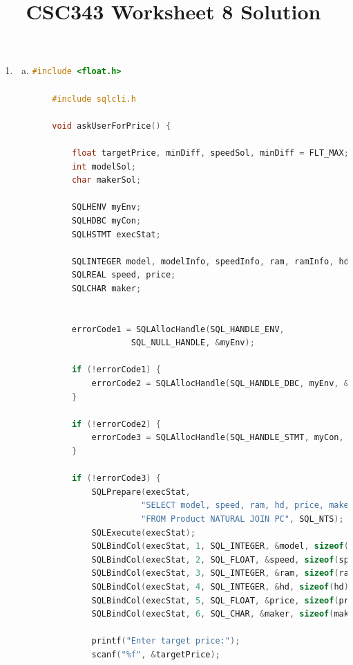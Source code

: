 \documentclass[12pt]{article}
\begin{document}
\title{CSC343 Worksheet 8 Solution}
\maketitle

\bigskip

\begin{enumerate}[1.]
    \item

    \bigskip

    \begin{enumerate}[a)]
        \item

    \begin{lstlisting}[language=c]
    #include <float.h>

    #include sqlcli.h

    void askUserForPrice() {

        float targetPrice, minDiff, speedSol, minDiff = FLT_MAX;
        int modelSol;
        char makerSol;

        SQLHENV myEnv;
        SQLHDBC myCon;
        SQLHSTMT execStat;

        SQLINTEGER model, modelInfo, speedInfo, ram, ramInfo, hd, hdInfo, priceInfo, makerInfo;
        SQLREAL speed, price;
        SQLCHAR maker;


        errorCode1 = SQLAllocHandle(SQL_HANDLE_ENV,
                    SQL_NULL_HANDLE, &myEnv);

        if (!errorCode1) {
            errorCode2 = SQLAllocHandle(SQL_HANDLE_DBC, myEnv, &myCon);
        }

        if (!errorCode2) {
            errorCode3 = SQLAllocHandle(SQL_HANDLE_STMT, myCon, &execStat)
        }

        if (!errorCode3) {
            SQLPrepare(execStat,
                      "SELECT model, speed, ram, hd, price, maker "
                      "FROM Product NATURAL JOIN PC", SQL_NTS);
            SQLExecute(execStat);
            SQLBindCol(execStat, 1, SQL_INTEGER, &model, sizeof(model), &modelInfo);
            SQLBindCol(execStat, 2, SQL_FLOAT, &speed, sizeof(speed), &speedInfo);
            SQLBindCol(execStat, 3, SQL_INTEGER, &ram, sizeof(ram), &ramInfo);
            SQLBindCol(execStat, 4, SQL_INTEGER, &hd, sizeof(hd), &hdInfo);
            SQLBindCol(execStat, 5, SQL_FLOAT, &price, sizeof(price), &priceInfo);
            SQLBindCol(execStat, 6, SQL_CHAR, &maker, sizeof(maker), &makerInfo);

            printf("Enter target price:");
            scanf("%f", &targetPrice);


\end{lstlisting}
\end{enumerate}
\end{enumerate}
\end{document}
